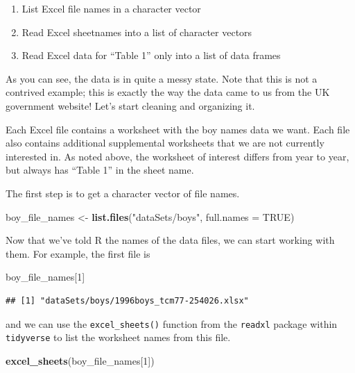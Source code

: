 \documentclass[]{book}
\newenvironment{Shaded}{\begin{snugshade}}{\end{snugshade}}
\newcommand{\DataTypeTok}[1]{\textcolor[rgb]{0.13,0.29,0.53}{#1}}
\newcommand{\DecValTok}[1]{\textcolor[rgb]{0.00,0.00,0.81}{#1}}
\newcommand{\KeywordTok}[1]{\textcolor[rgb]{0.13,0.29,0.53}{\textbf{#1}}}
\newcommand{\NormalTok}[1]{#1}
\newcommand{\OtherTok}[1]{\textcolor[rgb]{0.56,0.35,0.01}{#1}}
\newcommand{\StringTok}[1]{\textcolor[rgb]{0.31,0.60,0.02}{#1}}
\providecommand{\tightlist}{%
  \setlength{\itemsep}{0pt}\setlength{\parskip}{0pt}}
\begin{document}
\begin{enumerate}
\def\labelenumi{\arabic{enumi}.}
\tightlist
\item
  List Excel file names in a character vector
\item
  Read Excel sheetnames into a list of character vectors
\item
  Read Excel data for ``Table 1'' only into a list of data frames
\end{enumerate}

As you can see, the data is in quite a messy state. Note that this is
not a contrived example; this is exactly the way the data came to us
from the UK government website! Let's start cleaning and organizing
it.

Each Excel file contains a worksheet with the boy names data we want.
Each file also contains additional supplemental worksheets that we are
not currently interested in. As noted above, the worksheet of interest
differs from year to year, but always has ``Table 1'' in the sheet name.

The first step is to get a character vector of file names.

\begin{Shaded}
\begin{Highlighting}[]
\NormalTok{boy_file_names <-}\StringTok{ }\KeywordTok{list.files}\NormalTok{(}\StringTok{"dataSets/boys"}\NormalTok{, }\DataTypeTok{full.names =} \OtherTok{TRUE}\NormalTok{)}
\end{Highlighting}
\end{Shaded}

Now that we've told R the names of the data files, we can start working
with them. For example, the first file is

\begin{Shaded}
\begin{Highlighting}[]
\NormalTok{boy_file_names[}\DecValTok{1}\NormalTok{]}
\end{Highlighting}
\end{Shaded}

\begin{verbatim}
## [1] "dataSets/boys/1996boys_tcm77-254026.xlsx"
\end{verbatim}

and we can use the \texttt{excel\_sheets()} function from the \texttt{readxl} package
within \texttt{tidyverse} to list the worksheet names from this file.

\begin{Shaded}
\begin{Highlighting}[]
\KeywordTok{excel_sheets}\NormalTok{(boy_file_names[}\DecValTok{1}\NormalTok{])}
\end{Highlighting}
\end{Shaded}
\end{document}
